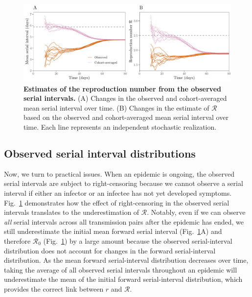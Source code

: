 \documentclass[12pt]{article}
\newcommand{\fref}[1]{Fig.~\ref{fig:#1}}
\begin{document}
\begin{figure}[!ht]
\includegraphics[width=\textwidth]{observedrR.pdf}
\caption{
\textbf{Estimates of the reproduction number from the observed serial intervals.}
(A) Changes in the observed and cohort-averaged mean serial interval over time.
(B) Changes in the estimate of $\mathcal R$ based on the observed and cohort-averaged mean serial interval over time.
Each line represents an independent stochastic realization.
}
\label{fig:obsrR}
\end{figure}

\subsection{Observed serial interval distributions}

Now, we turn to practical issues.
When an epidemic is ongoing, the observed serial intervals are subject to right-censoring because we cannot observe a serial interval if either an infector or an infectee has not yet developed symptoms.
\fref{obsrR} demonstrates how the effect of right-censoring in the observed serial intervals translates to the underestimation of $\mathcal R$.
Notably, even if we can observe \emph{all} serial intervals across all transmission pairs after the epidemic has ended, we still underestimate the initial mean forward serial interval (\fref{obsrR}A) and therefore $\mathcal R_0$ (\fref{obsrR}) by a large amount because the observed serial-interval distribution does not account for changes in the forward serial-interval distribution.
As the mean forward serial-interval distribution decreases over time, taking the average of all observed serial intervals throughout an epidemic will underestimate the mean of the initial forward serial-interval distribution, which provides the correct link between $r$ and $\mathcal R$.
\end{document}

